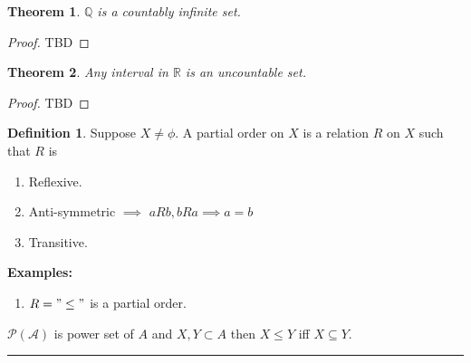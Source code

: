 \documentclass[12pt]{report}
\newtheorem{thm}{Theorem}
\theoremstyle{definition}
\newtheorem{defn}{Definition}
\begin{document}
\begin{thm}
    $\mathbb{Q}$ is a countably infinite set.
\end{thm}
\begin{proof}
    TBD
\end{proof}
\begin{thm}
    Any interval in $\mathbb{R}$ is an uncountable set.
\end{thm}
\begin{proof}
    TBD
\end{proof}
\begin{defn}
    Suppose $X \neq \phi$. A partial order on $X$ is a relation $R$ on $X$ such that $R$ is
    \begin{enumerate}
        \item Reflexive.
        \item Anti-symmetric $\implies$ $aRb, bRa \implies a=b$
        \item Transitive.
    \end{enumerate} 
\end{defn}
\textbf{Examples:}
\begin{enumerate}
    \item $R = "\leq"$ is a partial order.
\end{enumerate}
$\mathcal{P(A)}$ is power set of $A$ and $X,Y \subset A$ then $X \leq Y$ iff $X \subseteq Y$.
\hrule
\end{document}
